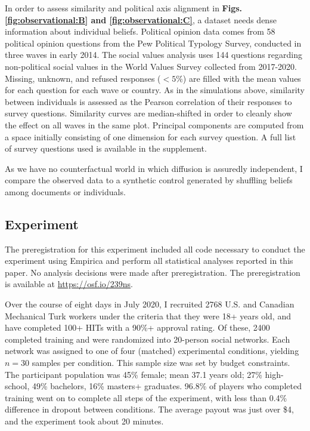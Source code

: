 \documentclass[9pt,twocolumn,twoside,lineno]{pnas-new}
\begin{document}
{In order to assess similarity and political axis alignment in \textbf{Figs. \ref{fig:observational:B} and \ref{fig:observational:C}}, a dataset needs dense information about individual beliefs. Political opinion data comes from 58 political opinion questions from the Pew Political Typology Survey\cite{pew2014}, conducted in three waves in early 2014.
The social values analysis uses 144 questions regarding non-political social values in the World Values Survey\cite{wvsa2020} collected from 2017-2020. Missing, unknown, and refused responses ($<5\%$) are filled with the mean values for each question for each wave or country. As in the simulations above, similarity between individuals is assessed as the Pearson correlation of their responses to survey questions. Similarity curves are median-shifted in order to cleanly show the effect on all waves in the same plot. Principal components are computed from a space initially consisting of one dimension for each survey question. A full list of survey questions used is available in the supplement.

As we have no counterfactual world in which diffusion is assuredly independent, I compare the observed data to a synthetic control generated by shuffling beliefs among documents or individuals.

\subsection*{Experiment}
The preregistration for this experiment included all code necessary to conduct the experiment using Empirica\cite{almaatouq2021empirica} and perform all statistical analyses reported in this paper. No analysis decisions were made after preregistration. The preregistration is available at \href{https://osf.io/239ns}{https://osf.io/239ns}.

Over the course of eight days in July 2020, I recruited 2768 U.S. and Canadian Mechanical Turk workers under the criteria that they were 18+ years old, and have completed 100+ HITs with a 90\%+ approval rating. Of these, 2400 completed training and were randomized into 20-person social networks. Each network was assigned to one of four (matched) experimental conditions, yielding $n=30$ samples per condition. This sample size was set by budget constraints. The participant population was 45\% female; mean 37.1 years old; 27\% high-school, 49\% bachelors, 16\% masters+ graduates. 96.8\% of players who completed training went on to complete all steps of the experiment, with less than 0.4\% difference in dropout between conditions. 
The average payout was just over \$4, and the experiment took about 20 minutes. 

}
\end{document}
